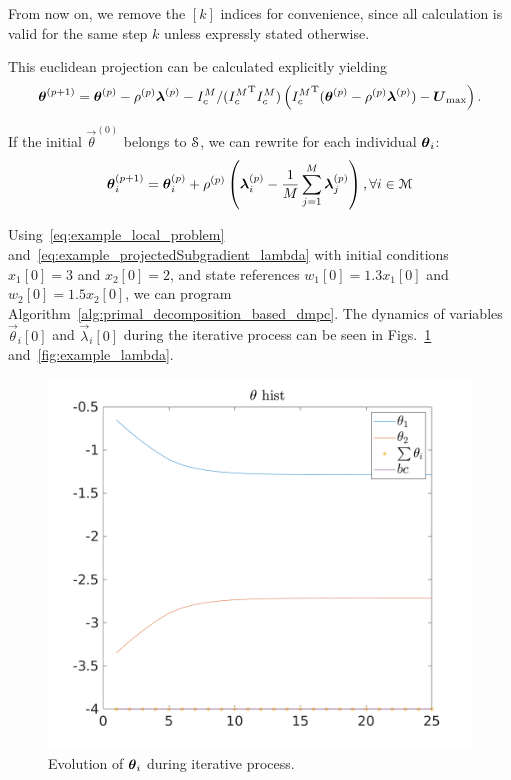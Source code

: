 \documentclass[../main.tex]{subfiles}
\begin{document}
From now on, we remove the $[k]$ indices for convenience, since all calculation is valid for the same step $k$ unless expressly stated otherwise.

This euclidean projection can be calculated explicitly yielding
\begin{equation}
    \boldsymbol{\theta}^{(p+1)}=\boldsymbol{\theta}^{(p)}-\rho^{(p)}\boldsymbol{\lambda}^{(p)}-{I_{c}^M}/({I_{c}^M}^{\mathrm{T}} {I_{c}^M})\left({I_{c}^M}^{\mathrm{T}}(\boldsymbol{\theta}^{(p)}-\rho^{(p)}\boldsymbol{\lambda}^{(p)}) -\boldsymbol{U}_{\max}\right).
\end{equation}

If the initial ${\vec{\theta}}^{(0)}$ belongs to $\mathcal{S}$, we can rewrite for each individual $\boldsymbol{\theta}_i$:
\begin{equation}
  \label{eq:example_projectedSubgradient_lambda}
 \boldsymbol{\theta}_i^{(p+1)}=\boldsymbol{\theta}_i^{(p)}+\rho^{(p)}\left(\boldsymbol{\lambda}_i^{(p)}-\frac{1}{M}\sum_{j=1}^{M}\boldsymbol{\lambda}_j^{(p)}\right),\forall i\in\mathcal{M}
\end{equation}

Using~\eqref{eq:example_local_problem} and~\eqref{eq:example_projectedSubgradient_lambda} with initial conditions ${x_{1}[0]=3}$ and ${x_{2}[0]=2}$, and state references ${w_{1}[0]=1.3x_{1}[0]}$ and ${w_{2}[0]=1.5x_{2}[0]}$, we can program Algorithm~\ref{alg:primal_decomposition_based_dmpc}.
The dynamics of variables $\vec{\theta}_{i}[0]$ and $\vec{\lambda}_{i}[0]$ during the iterative process can be seen in Figs.~\ref{fig:example_theta} and~\ref{fig:example_lambda}.

\begin{figure}[h]
  \centering
  \includegraphics[width=.5\textwidth]{../img/example_theta.png}
  \caption{Evolution of $\boldsymbol{\theta}_i$ during iterative process. }\label{fig:example_theta}
\end{figure}
\end{document}
